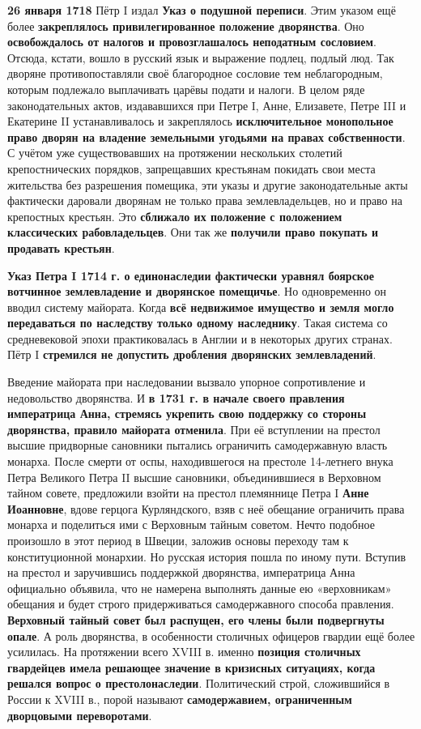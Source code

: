 \documentclass{article}
\begin{document}
\hfill

\textbf{26 января 1718} Пётр I издал \textbf{Указ о подушной переписи}. Этим указом ещё более \textbf{закреплялось привилегированное положение дворянства}. Оно \textbf{освобождалось от налогов и провозглашалось неподатным сословием}. Отсюда, кстати, вошло в русский язык и выражение подлец, подлый люд. Так дворяне противопоставляли своё благородное сословие тем неблагородным, которым подлежало выплачивать царёвы подати и налоги. В целом ряде законодательных актов, издававшихся при Петре I, Анне, Елизавете, Петре III и Екатерине II устанавливалось и закреплялось \textbf{исключительное монопольное право дворян на владение земельными угодьями на правах собственности}. С учётом уже существовавших на протяжении нескольких столетий крепостнических порядков, запрещавших крестьянам покидать свои места жительства без разрешения помещика, эти указы и другие законодательные акты фактически даровали дворянам не только права землевладельцев, но и право на крепостных крестьян. Это \textbf{сближало их положение с положением классических рабовладельцев}. Они так же \textbf{получили право покупать и продавать крестьян}.

\hfill

\textbf{Указ Петра I 1714 г. о единонаследии фактически уравнял боярское вотчинное землевладение и дворянское помещичье}. Но одновременно он вводил систему майората. Когда \textbf{всё недвижимое имущество и земля могло передаваться по наследству только одному наследнику}. Такая система со средневековой эпохи практиковалась в Англии и в некоторых других странах. Пётр I \textbf{стремился не допустить дробления дворянских землевладений}.

\hfill

Введение майората при наследовании вызвало упорное сопротивление и недовольство дворянства. И \textbf{в 1731 г. в начале своего правления императрица Анна, стремясь укрепить свою поддержку со стороны дворянства, правило майората отменила}. При её вступлении на престол высшие придворные сановники пытались ограничить самодержавную власть монарха. После смерти от оспы, находившегося на престоле 14-летнего внука Петра Великого Петра II высшие сановники, объединившиеся в Верховном тайном совете, предложили взойти на престол племяннице Петра I \textbf{Анне Иоанновне}, вдове герцога Курляндского, взяв с неё обещание ограничить права монарха и поделиться ими с Верховным тайным советом. Нечто подобное произошло в этот период в Швеции, заложив основы переходу там к конституционной монархии. Но русская история пошла по иному пути. Вступив на престол и заручившись поддержкой дворянства, императрица Анна официально объявила, что не намерена выполнять данные ею «верховникам» обещания и будет строго придерживаться самодержавного способа правления. \textbf{Верховный тайный совет был распущен, его члены были подвергнуты опале}. А роль дворянства, в особенности столичных офицеров гвардии ещё более усилилась. На протяжении всего XVIII в. именно \textbf{позиция столичных гвардейцев имела решающее значение в кризисных ситуациях, когда решался вопрос о престолонаследии}. Политический строй, сложившийся в России к XVIII в., порой называют \textbf{самодержавием, ограниченным дворцовыми переворотами}.
\end{document}

